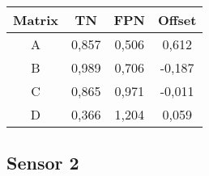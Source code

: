\documentclass[a4papper, 11pt]{article}
\begin{document}
\begin{itemize}
            \begin{center}
              \begin{tabular}{|c|c|c|c|}
                \hline %
             \rowcolor{light-gray}     Matrix  &  TN   &  FPN  &  Offset  \tabularnewline
                \hline %
                    A     & 0,857 & 0,506 & 0,612    \tabularnewline
                \hline %
                    B     & 0,989 & 0,706 & -0,187   \tabularnewline
                \hline %
                    C     & 0,865 & 0,971 & -0,011    \tabularnewline
                \hline %
                    D     & 0,366 & 1,204 & 0,059    \tabularnewline
                \hline %
              \end{tabular}
            \end{center}

        \end{itemize}

    \FloatBarrier 


      \subsection{Sensor 2}      
\end{document}
